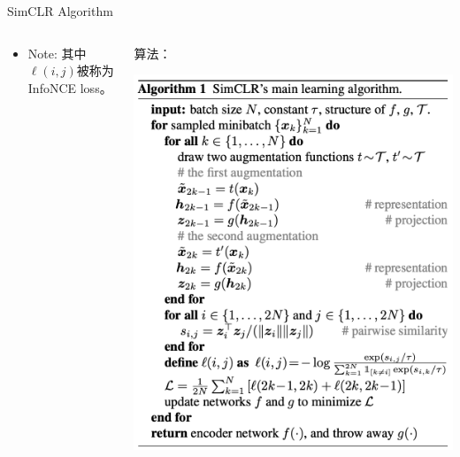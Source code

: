 \begin{frame}{SimCLR Algorithm}
    \begin{columns}
        \begin{column}{0.65\textwidth}
            \begin{itemize}
                \item Note: 其中 $\ell(i, j)$被称为 InfoNCE loss。
            \end{itemize}
        \end{column}
        \begin{column}{0.37\textwidth}
            算法：
            \begin{center}
                \includegraphics[width=\textwidth]{assets/simclra.png}
            \end{center}
                \end{column}
        \end{columns}
    
\end{frame}

